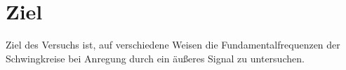 \section{Ziel}
\label{sec:Ziel}
\setlength{\parindent}{0pt}
Ziel des Versuchs ist, auf verschiedene Weisen die Fundamentalfrequenzen der Schwingkreise bei Anregung durch ein äußeres
Signal zu untersuchen.